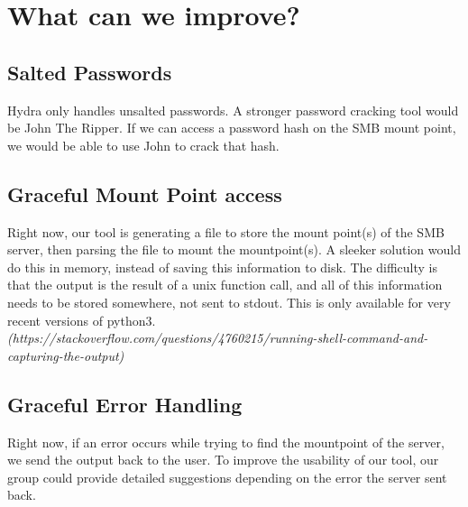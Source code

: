\documentclass[a4paper]{article}
\begin{document}
\section{What can we improve?}
\subsection{Salted Passwords}
Hydra only handles unsalted passwords. A stronger password cracking tool would be John The Ripper. If we can access a password hash on the SMB mount point, we would be able to use John to crack that hash.

\subsection{Graceful Mount Point access}
Right now, our tool is generating a file to store the mount point(s) of the SMB server, then parsing the file to mount the mountpoint(s). A sleeker solution would do this in memory, instead of saving this information to disk. The difficulty is that the output is the result of a unix function call, and all of this information needs to be stored somewhere, not sent to stdout. This is only available for very recent versions of python3. 
\newline\newline\small\textit{(https://stackoverflow.com/questions/4760215/running-shell-command-and-capturing-the-output)}

\subsection{Graceful Error Handling}
Right now, if an error occurs while trying to find the mountpoint of the server, we send the output back to the user. To improve the usability of our tool, our group could provide detailed suggestions depending on the error the server sent back.
\end{document}
